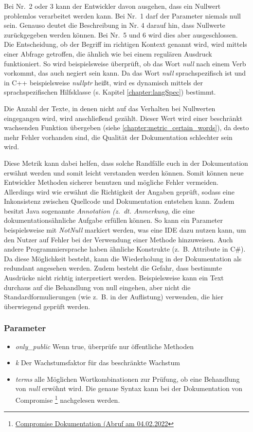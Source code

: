  Bei Nr.~2 oder 3 kann der Entwickler davon ausgehen, dass ein Nullwert problemlos verarbeitet werden kann. Bei Nr.~1 darf der Parameter niemals null sein.  Genauso deutet die Beschreibung in Nr. 4 darauf hin, dass Nullwerte zurückgegeben werden können. Bei Nr.~5 und 6 wird dies aber ausgeschlossen. Die Entscheidung, ob der Begriff im richtigen Kontext genannt wird, wird mittels einer Abfrage getroffen, die ähnlich wie bei einem regulären Ausdruck funktioniert. So wird beispielsweise überprüft, ob das Wort \textit{null} nach einem Verb vorkommt, das auch negiert sein kann. Da das Wort \textit{null} sprachspezifisch ist und in C++ beispielsweise \textit{nullptr} heißt, wird es dynamisch mittels der sprachspezifischen Hilfsklasse (s. Kapitel \ref{chapter:langSpec}) bestimmt. 
 
 Die Anzahl der Texte, in denen nicht auf das Verhalten bei Nullwerten eingegangen wird, wird anschließend gezählt. Dieser Wert wird einer beschränkt wachsenden Funktion übergeben (siehe \ref{chapter:metric_certain_words}), da desto mehr Fehler vorhanden sind, die Qualität der Dokumentation schlechter sein wird. 
 
 Diese Metrik kann dabei helfen, dass solche Randfälle euch in der Dokumentation erwähnt werden und somit leicht verstanden werden können. Somit können neue Entwickler Methoden sicherer benutzen und mögliche Fehler vermeiden. Allerdings wird wie erwähnt die Richtigkeit der Angaben geprüft, sodass eine Inkonsistenz zwischen Quellcode und Dokumentation entstehen kann. Zudem besitzt Java sogenannte \textit{Annotation (z.~dt. Anmerkung}, die eine dokumentationsähnliche Aufgabe erfüllen können. So kann ein Parameter beispielsweise mit \textit{NotNull} markiert werden, was eine IDE dazu nutzen kann, um den Nutzer auf Fehler bei der Verwendung einer Methode hinzuweisen. Auch andere Programmiersprache haben ähnliche Konstrukte (z.~B. Attribute in C\#). Da diese Möglichkeit besteht, kann die Wiederholung in der Dokumentation als redundant angesehen werden. Zudem besteht die Gefahr, dass bestimmte Ausdrücke nicht richtig interpretiert werden. Beispielsweise kann ein Text durchaus auf die Behandlung von null eingehen, aber nicht die Standardformulierungen (wie z.~B. in der Auflistung) verwenden, die hier überwiegend geprüft werden.
 
   \subsubsection{Parameter}
\begin{itemize}
    \item \textit{only\_public} Wenn true,  überprüfe nur öffentliche Methoden
    \item \textit{k} Der Wachstumsfaktor für das beschränkte Wachstum
    
    \item \textit{terms} alle Möglichen Wortkombinationen zur Prüfung, ob eine Behandlung von \textit{null} erwöhnt wird. Die genaue Syntax kann bei der Dokumentation von Compromise \footnote{\href{https://observablehq.com/@spencermountain/compromise-match-syntax}{Compromise Dokumentation (Abruf am 04.02.2022}} nachgelesen werden.
    
\end{itemize}
 
